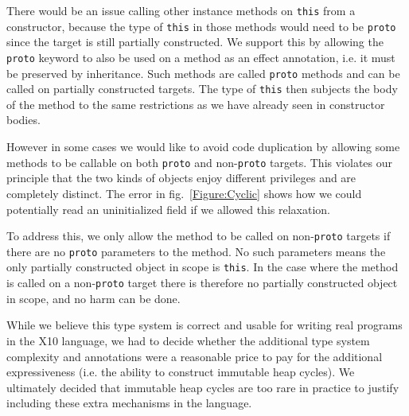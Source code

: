 %

There would be an issue calling other instance methods on \texttt{this} from a
constructor, because the type of \texttt{this} in those methods would need to
be \texttt{proto} since the target is still partially constructed.  We support
this by allowing the \texttt{proto} keyword to also be used on a method as an
effect annotation, i.e. it must be preserved by inheritance.  Such methods are
called \texttt{proto} methods and can be called on partially constructed
targets.  The type of \texttt{this} then subjects the body of the method to the
same restrictions as we have already seen in constructor bodies.

However in some cases we would like to avoid code duplication by allowing some
methods to be callable on both \texttt{proto} and non-\texttt{proto} targets.
This violates our principle that the two kinds of objects enjoy different
privileges and are completely distinct.
The error  in fig.~\ref{Figure:Cyclic}
shows how we could potentially read an uninitialized field if we allowed this
relaxation.

To address this, we only allow the method to be called on non-\texttt{proto}
targets if there are no \texttt{proto} parameters to the method.  No such
parameters means the only partially constructed object in scope is
\texttt{this}.  In the case where the method is called on a non-\texttt{proto}
target there is therefore no partially constructed object in scope, and no harm
can be done.

While we believe this type system is correct and usable for writing real
programs in the X10 language, we had to decide whether the additional type
system complexity and annotations were a reasonable price to pay for the
additional expressiveness (i.e. the ability to construct immutable heap
cycles).  We ultimately decided that immutable heap cycles are too rare in
practice to justify including these extra mechanisms in the language.
